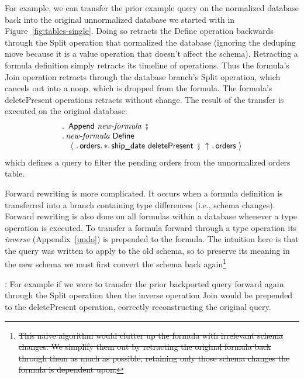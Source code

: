 \documentclass[english,submission]{programming}
\theoremstyle{definition}
\DeclareMathOperator{\exec}{\ \fatsemi\ \ }
\providecommand{\DIFadd}[1]{{\protect\color{blue}\uwave{#1}}} %
\providecommand{\DIFdel}[1]{{\protect\color{red}\sout{#1}}} %
\providecommand{\DIFaddbegin}{} %
\providecommand{\DIFaddend}{} %
\providecommand{\DIFdelbegin}{} %
\providecommand{\DIFdelend}{} %
\begin{document}
For example, we can transfer the prior example query on the normalized database back into the original unnormalized database we started with in Figure~\ref{fig:tables-single}. Doing so retracts the \textsf{Define} operation backwards through the \textsf{Split} operation that normalized the database (ignoring the deduping \textsf{move} because it is a value operation that doesn't affect the schema). Retracting a formula definition simply retracts its timeline of operations. Thus the formula's \textsf{Join} operation retracts through the database branch's \textsf{Split} operation, which cancels out into a \textsf{noop}, which is dropped from the formula. The formula's \textsf{deletePresent} operations retracts without change. The result of the transfer is executed on the original database:
\[
\begin{array}{l}
  \ldotp \textsf{ Append } \textit{new-formula} \exec\\
  \ldotp \textit{new-formula} \textsf{ Define } \\
  \quad \langle
\ \ldotp \textsf{orders}\ldotp * \ldotp \textsf{ship\_date deletePresent} \exec
\!\!\uparrow \ \ldotp \textsf{orders}\
  \rangle\\
\end{array}
\]
which defines a query to filter the pending orders from the unnormalized orders table.

Forward rewriting is more complicated. It occurs when a formula definition is transferred into a branch containing type differences (i.e., schema changes). Forward rewriting is also done on all formulas within a database whenever a type operation is executed. To transfer a formula forward through a type operation its \textit{inverse} (Appendix~\ref{undo}) is prepended to the formula. The intuition here is that the query was written to apply to the old schema, so to preserve its meaning in the new schema we must first convert the schema back again\DIFdelbegin \footnote{\DIFdel{This naive algorithm would clutter up the formula with irrelevant schema changes. We simplify them out by retracting the original formula back through them as much as possible, retaining only those schema changes the formula is dependent upon.}}%
\addtocounter{footnote}{-1}%
\DIFdel{.
}\DIFdelend \DIFaddbegin \DIFadd{.
}\DIFaddend For example if we were to transfer the prior backported query forward again through the \textsf{Split} operation then the inverse operation \textsf{Join} would be prepended to the \textsf{deletePresent} operation, correctly reconstructing the original query.
\end{document}

